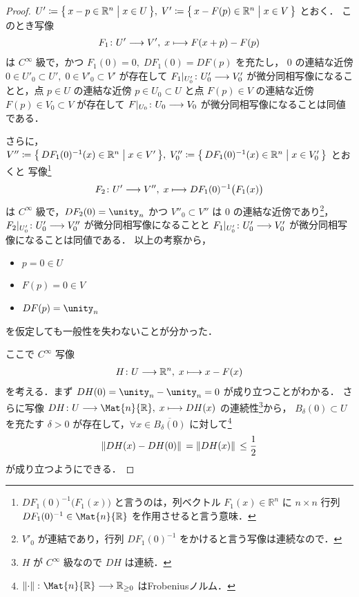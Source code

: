\documentclass[geometry_main]{subfiles}
\begin{document}
\begin{proof}
    $U' \coloneqq \bigl\{\, x - p \in \mathbb{R}^n \bigm| x \in U \,\bigr\},\; V' \coloneqq \bigl\{\, x - F(p) \in \mathbb{R}^n \bigm| x \in V \,\bigr\}$ とおく．
    このとき写像
    \begin{align}
        F_1 \colon U' \longrightarrow V',\; x \longmapsto F(x + p) - F(p)
    \end{align}
    は $C^\infty$ 級で，かつ $F_1(0) = 0,\; DF_1(0) = DF(p)$ を充たし，
    $0$ の連結な近傍 $0 \in U'_0 \subset U',\; 0 \in V'_0 \subset V'$ が存在して $F_1|_{U'_0} \colon U'_0 \longrightarrow V'_0$ が微分同相写像になることと，点 $p \in U$ の連結な近傍 $p \in U_0 \subset U$ と点 $F(p) \in V$ の連結な近傍 $F(p) \in V_0 \subset V$ が存在して $F|_{U_0} \colon U_0 \longrightarrow V_0$ が微分同相写像になることは同値である．

    さらに，$V'' \coloneqq \bigl\{\, DF_1(0)^{-1}(x) \in \mathbb{R}^n \bigm| x \in V' \,\bigr\},\; V''_0 \coloneqq \bigl\{\, DF_1(0)^{-1}(x) \in \mathbb{R}^n \bigm| x \in V'_0 \,\bigr\}$ とおくと
    写像\footnote{$DF_1(0)^{-1} \bigl(F_1(x)\bigr)$ と言うのは，列ベクトル $F_1(x) \in \mathbb{R}^n$ に $n \times n$ 行列 $DF_1(0)^{-1} \in \Mat{n}{\mathbb{R}}$ を作用させると言う意味．} 
    \begin{align}
        F_2 \colon U' \longrightarrow V'',\; x \longmapsto DF_1(0)^{-1} \bigl(F_1(x)\bigr)
    \end{align}
    は $C^\infty$ 級で，$DF_2(0) = \unity_n$ かつ $V''_0 \subset V''$ は $0$ の連結な近傍であり\footnote{$V'_0$ が連結であり，行列 $DF_1(0)^{-1}$ をかけると言う写像は連続なので．}，
    $F_2|_{U'_0} \colon U'_0 \longrightarrow V''_0$ が微分同相写像になることと $F_1|_{U'_0} \colon U'_0 \longrightarrow V'_0$ が微分同相写像になることは同値である．
    以上の考察から，
    \begin{itemize}
        \item $p = 0 \in U$
        \item $F(p) = 0 \in V$
        \item $DF(p) = \unity_n$
    \end{itemize}
    を仮定しても一般性を失わないことが分かった．


    ここで $C^\infty$ 写像
    \begin{align}
        H \colon U \longrightarrow \mathbb{R}^n,\; x \longmapsto x - F(x)
    \end{align}
    を考える．まず $DH(0) = \unity_n - \unity_n = 0$ が成り立つことがわかる．
    さらに写像 $DH \colon U \lto \Mat{n}{\mathbb{R}},\; x \lmto DH(x)$ の連続性\footnote{$H$ が $C^\infty$ 級なので $DH$ は連続．}から，
    $B_\delta(0) \subset U$ を充たす $\delta > 0$ が存在して，$\forall x \in \overline{B_\delta(0)}$ に対して\footnote{$\norm*{\cdot} \colon \Mat{n}{\mathbb{R}} \lto \mathbb{R}_{\ge 0}$ はFrobeniusノルム．}
    \begin{align}
        \norm*{DH(x) - DH(0)} = \norm*{DH(x)} \le \frac{1}{2}
    \end{align}
    が成り立つようにできる．


\end{proof}
\end{document}
